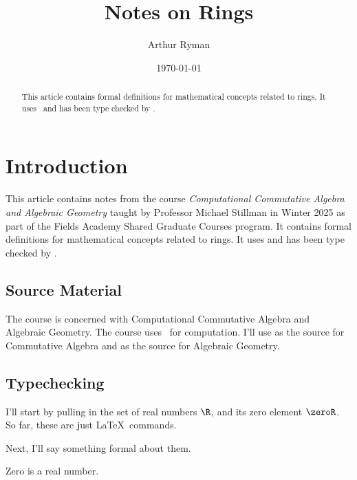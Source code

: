 \documentclass{amsart}
\begin{document}
\title{Notes on Rings}
\author{Arthur Ryman}
\date{\today}

\begin{abstract}
    This article contains formal definitions for mathematical concepts related to rings.
    It uses \ZN\ and has been type checked by \fuzz.
\end{abstract}

\maketitle

\tableofcontents

\section{Introduction}

This article contains notes from the course \textit{Computational Commutative Algebra and Algebraic Geometry}
taught by Professor Michael Stillman in Winter 2025 as part of the Fields Academy Shared Graduate Courses
program.
It contains formal definitions for mathematical concepts related to rings.
It uses \ZN\cite{spivey-zrm} and has been type checked by \fuzz\cite{spivey-fm}.

\subsection{Source Material}

The course is concerned with Computational Commutative Algebra and Algebraic Geometry.
The course uses \mzMtwo\ for computation.
I'll use \cite{atiyah-itca} as the source for Commutative Algebra
and \cite{hartshorne-ag} as the source for Algebraic Geometry.

\subsection{Typechecking}

I'll start by pulling in the set of real numbers $\R$, and its zero element $\zeroR$.
So far, these are just \LaTeX\ commands.

Next, I'll say something formal about them.

\begin{remark}
Zero is a real number.
\begin{zed}
	\zeroR \in \R
\end{zed}
\end{remark}
\end{document}
